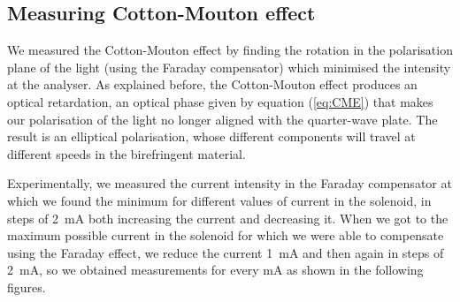 \documentclass[11pt,a4paper]{article}
\begin{document}
\subsection{Measuring Cotton-Mouton effect}

We measured the Cotton-Mouton effect by finding the rotation in the polarisation plane of the light (using the Faraday compensator) which minimised the intensity at the analyser. As explained before, the Cotton-Mouton effect produces an optical retardation, an optical phase given by equation (\ref{eq:CME}) that makes our polarisation of the light no longer aligned with the quarter-wave plate. The result is an elliptical polarisation, whose different components will travel at different speeds in the birefringent material.

Experimentally, we measured the current intensity in the Faraday compensator at which we found the minimum for different values of current in the solenoid, in steps of \SI{2}{\mA} both increasing the current and decreasing it. When we got to the maximum possible current in the solenoid for which we were able to compensate using the Faraday effect, we reduce the current \SI{1}{\mA} and then again in steps of \SI{2}{\mA}, so we obtained measurements for every \si{\mA} as shown in the following figures.
\end{document}
